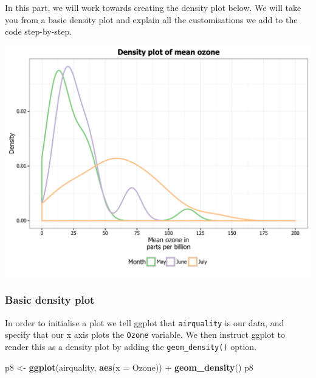 \documentclass[]{article}
\newenvironment{Shaded}{\begin{snugshade}}{\end{snugshade}}
\newcommand{\KeywordTok}[1]{\textcolor[rgb]{0.13,0.29,0.53}{\textbf{{#1}}}}
\newcommand{\DataTypeTok}[1]{\textcolor[rgb]{0.13,0.29,0.53}{{#1}}}
\newcommand{\StringTok}[1]{\textcolor[rgb]{0.31,0.60,0.02}{{#1}}}
\newcommand{\NormalTok}[1]{{#1}}
\begin{document}
In this part, we will work towards creating the density plot below. We
will take you from a basic density plot and explain all the
customisations we add to the code step-by-step.

\begin{center}\includegraphics{0_all_posts_pdf/density_final-1} \end{center}

\subsubsection{Basic density plot}\label{basic-density-plot}

In order to initialise a plot we tell ggplot that \texttt{airquality} is
our data, and specify that our x axis plots the \texttt{Ozone} variable.
We then instruct ggplot to render this as a density plot by adding the
\texttt{geom\_density()} option.

\begin{Shaded}
\begin{Highlighting}[]
\NormalTok{p8 <-}\StringTok{ }\KeywordTok{ggplot}\NormalTok{(airquality, }\KeywordTok{aes}\NormalTok{(}\DataTypeTok{x =} \NormalTok{Ozone)) +}\StringTok{ }\KeywordTok{geom_density}\NormalTok{()}
\NormalTok{p8}
\end{Highlighting}
\end{Shaded}
\end{document}
